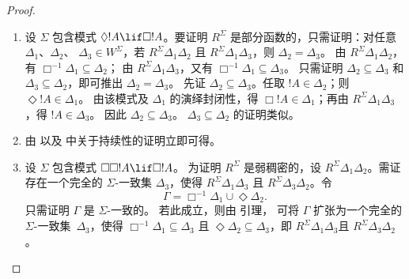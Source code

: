 \documentclass[../../../include/open-logic-section]{subfiles}
\begin{document}
\begin{proof}
  \begin{enumerate}
  \item 设 $\Sigma$ 包含模式 $\Diamond !A \lif \Box !A$。要证明
    $R^\Sigma$ 是部分函数的，只需证明：对任意 $\Delta_1$、$\Delta_2$、
    $\Delta_3 \in W^\Sigma$，若 $R^\Sigma \Delta_1\Delta_2$ 且
    $R^\Sigma \Delta_1\Delta_3$，则 $\Delta_2=\Delta_3$。
    由 $R^\Sigma \Delta_1\Delta_2$，有 $\Box^{-1}\Delta_1 \subseteq \Delta_2$；
    由 $R^\Sigma \Delta_1\Delta_3$，又有
    $\Box^{-1}\Delta_1 \subseteq
    \Delta_3$。
    只需证明 $\Delta_2 \subseteq \Delta_3$ 和 $\Delta_3 \subseteq \Delta_2$，即可推出 $\Delta_2=\Delta_3$。
    先证 $\Delta_2 \subseteq \Delta_3$。任取
    $!A \in \Delta_2$；则 $\Diamond!A \in \Delta_1$。
    由该模式及 $\Delta_1$ 的演绎封闭性，得
    $\Box!A \in \Delta_1$；再由
    $R^\Sigma \Delta_1\Delta_3$，得 $!A \in \Delta_3$。
    因此 $\Delta_2 \subseteq \Delta_3$。
    $\Delta_3 \subseteq \Delta_2$ 的证明类似。
  \item 由  以及
     中关于持续性的证明立即可得。

  \item 设 $\Sigma$ 包含模式 $\Box\Box!A \lif \Box!A$。
    为证明 $R^\Sigma$ 是弱稠密的，设
    $R^\Sigma \Delta_1\Delta_2$。需证存在一个完全的
    $\Sigma$-一致集 $\Delta_3$，使得
    $R^\Sigma \Delta_1\Delta_3$ 且
    $R^\Sigma \Delta_3\Delta_2$。令
    \[
    \Gamma = \Box^{-1}\Delta_1 \cup \Diamond\Delta_2.
    \]
    只需证明 $\Gamma$ 是 $\Sigma$-一致的。
    若此成立，则由 引理，
    可将 $\Gamma$ 扩张为一个完全的 $\Sigma$-一致集~$\Delta_3$，使得
    $\Box^{-1}\Delta_1 \subseteq \Delta_3$ 且
    $\Diamond\Delta_2 \subseteq \Delta_3$，即
    $R^\Sigma \Delta_1\Delta_3$且
    $R^\Sigma \Delta_3\Delta_2$。


\end{enumerate}
\end{proof}
\end{document}
